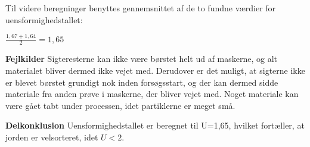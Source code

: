 Til videre beregninger benyttes gennemsnittet af de to fundne værdier for uensformighedstallet: 

\begin{center}
	$\frac{1,67+1,64}{2}=1,65$
\end{center}

\textbf{Fejlkilder}
\newline
Sigteresterne kan ikke være børstet helt ud af maskerne, og alt materialet bliver dermed ikke vejet med. Derudover er det muligt, at sigterne ikke er blevet børstet grundigt nok inden forsøgsstart, og der kan dermed sidde materiale fra anden prøve i maskerne, der bliver vejet med.
\newline
Noget materiale kan være gået tabt under processen, idet partiklerne er meget små. 
\newline
\newline

\textbf{Delkonklusion}
\newline
Uensformighedstallet er beregnet til U=1,65, hvilket fortæller, at jorden er velsorteret, idet $U<2$.  